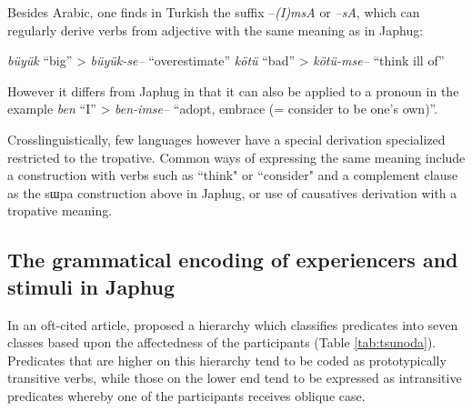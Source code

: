 \documentclass[oldfontcommands,oneside,a4paper,11pt]{article}
\newcommand{\ipa}[1]{{\phon #1}} %
\begin{document}
   Besides Arabic, one finds in Turkish the suffix --\textit{(I)msA} \citet[56]{goksel05grammar} or \textit{--sA}, which can regularly derive verbs from adjective with the same meaning as in Japhug:
   
        \begin{exe}
\ex 
 \glt   \textit{büyük} ``big'' > \textit{büyük-se--} ``overestimate''
 \glt \textit{kötü } ``bad'' > \textit{ kötü-mse--} ``think ill of''
   \end{exe}
   However it differs from Japhug in that it can also be applied to a pronoun in the example \textit{ben} ``I'' > \textit{ben-imse--} ``adopt, embrace (= consider to be one's own)''.
   
   Crosslinguistically, few languages however have a special derivation specialized restricted to the tropative. Common ways of expressing the same meaning include a construction with verbs such as ``think" or ``consider" and a complement clause as the \ipa{sɯpa} construction above in Japhug, or use of causatives derivation with a tropative meaning.
    

\subsection{The grammatical encoding of experiencers and stimuli in Japhug } \label{sec:encoding}
In an oft-cited article, \citet{tsunoda85tr}  proposed a hierarchy which classifies predicates into seven classes based upon the affectedness of the participants (Table \ref{tab:tsunoda}). Predicates that are higher on this hierarchy tend to be coded as prototypically transitive verbs, while those on the lower end tend to be expressed as intransitive predicates whereby one of the participants receives oblique case.


\begin{table}[H]
\caption{\citet{tsunoda85tr}'s verb type hierarchy}\label{tab:tsunoda}
\end{table}
\end{document}
